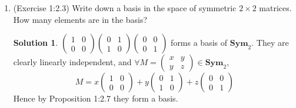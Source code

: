 \documentclass[]{book}
\theoremstyle{definition}
\newtheorem*{soln}{Solution}
\newcommand{\0}{\mathbf{0}}
\begin{document}
\begin{enumerate}
\item (Exercise 1:2.3)
Write down a basis in the
space of symmetric $2\times 2$ matrices. How many elements are in the basis?
\begin{soln}
$\begin{pmatrix}
1 & 0 \\
0 & 0
\end{pmatrix}
\begin{pmatrix}
0 & 1 \\
1 & 0
\end{pmatrix}
\begin{pmatrix}
0 & 0 \\
0 & 1
\end{pmatrix}$ forms a basis of $\mathbf{Sym}_2$. \newline
They are clearly linearly independent, and $\forall M=
\begin{pmatrix}
x & y \\
y & z
\end{pmatrix}\in \mathbf{Sym}_2 $,
\[ M=x
\begin{pmatrix}
1 & 0 \\
0 & 0
\end{pmatrix}+y
\begin{pmatrix}
0 & 1 \\
1 & 0
\end{pmatrix}+z
\begin{pmatrix}
0 & 0 \\
0 & 1
\end{pmatrix}
\]
Hence by Proposition 1:2.7 they form a basis.
\end{soln}


\end{enumerate}
\end{document}

